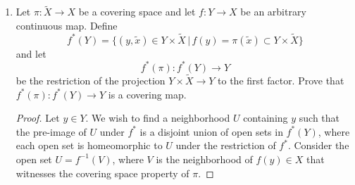 \documentclass{article}
\begin{document}
\begin{enumerate}
\begin{proof}
      Given $U_i$, to obtain $U_{i+1}\subseteq U_i$, let $A$ and $B$ be
      disjoint neighborhoods of $x$ and $g_{i+1}\cdot x$ respectively. Note
      that because the action is free, $g_{i+1}\cdot x\neq x$, and then
      because $X$ is Hausdorff, neighborhoods $A$ and $B$ exist. Set
      $U_{i+i}$ to $U_i\cap A\cap g_{i+1}^{-1}(B)$. Then $U_{i+1}$ would
      be a neighborhood of $x$, and is disjoint from $g_{i+1}(U_{i+1})$
      because $g_{i+1}(U_{i+1})\subseteq B$, which is disjoint from
      $A\supseteq U_{i+1}$, as we wish to show.
    \end{proof}

  \item Let $\pi:\tilde{X}\rightarrow X$ be a covering space and let
    $f:Y\rightarrow X$ be an arbitrary continuous map. Define
    \begin{equation*}
      f^*(Y) = \{(y,\tilde{x})\in Y\times\tilde{X}\,|\,
      f(y)=\pi(\tilde{x})\subset Y\times\tilde{X}\}
    \end{equation*}
    and let
    \begin{equation*}
      f^*(\pi):f^*(Y)\rightarrow Y
    \end{equation*}
    be the restriction of the projection $Y\times\tilde{X}\rightarrow Y$ to
    the first factor. Prove that $f^*(\pi):f^*(Y)\rightarrow Y$ is a
    covering map.

    \begin{proof}
      Let $y\in Y$. We wish to find a neighborhood $U$ containing $y$ such
      that the pre-image of $U$ under $f^*$ is a disjoint union of open
      sets in $f^*(Y)$, where each open set is homeomorphic to $U$ under
      the restriction of $f^*$. Consider the open set $U=f^{-1}(V)$, where
      $V$ is the neighborhood of $f(y)\in X$ that witnesses the covering
      space property of $\pi$.
    \end{proof}
\end{enumerate}
\end{document}
